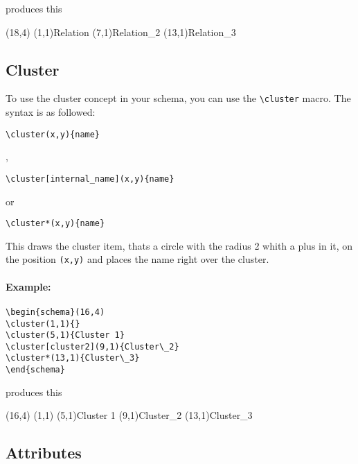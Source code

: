 \documentclass[a4paper,11pt]{article}
\begin{document}
produces this

\begin{schema}(18,4)
\relation(1,1){Relation}
\relation[relation2](7,1){Relation\_2}
\relation*(13,1){Relation\_3}
\end{schema}

\subsection{Cluster}

To use the cluster concept in your schema, you can use the \verb|\cluster| macro.
The syntax is as followed:

\begin{verbatim}
\cluster(x,y){name}
\end{verbatim}

,

\begin{verbatim}
\cluster[internal_name](x,y){name}
\end{verbatim}

or

\begin{verbatim}
\cluster*(x,y){name}
\end{verbatim}

This draws the cluster item, thats a circle with the radius 2 whith a 
plus in it, on the position {\tt (x,y)} and places the name right over 
the cluster.

\paragraph{Example:}

\begin{verbatim}
\begin{schema}(16,4)
\cluster(1,1){}
\cluster(5,1){Cluster 1}
\cluster[cluster2](9,1){Cluster\_2}
\cluster*(13,1){Cluster\_3}
\end{schema}
\end{verbatim}

produces this

\begin{schema}(16,4)
\cluster(1,1){}
\cluster(5,1){Cluster 1}
\cluster[cluster2](9,1){Cluster\_2}
\cluster*(13,1){Cluster\_3}
\end{schema}

\subsection{Attributes}
\end{document}
